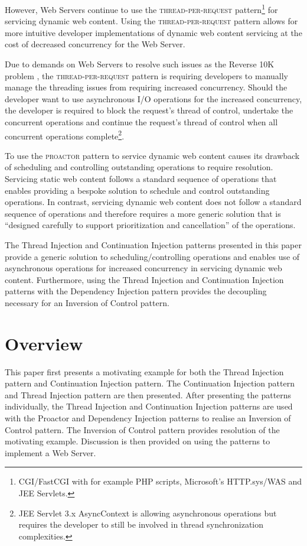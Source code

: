 \documentclass[prodmode]{style/acmlarge}
\begin{document}
However, Web Servers continue to use the \textsc{thread-per-request}
pattern\footnote{CGI/FastCGI with for example PHP scripts, Microsoft's
HTTP.sys/WAS and JEE Servlets.} for servicing dynamic web content.  Using the
\textsc{thread-per-request} pattern allows for more intuitive developer
implementations of dynamic web content servicing at the cost of decreased
concurrency for the Web Server.

Due to demands on Web Servers to resolve such issues as the Reverse 10K problem
\cite{reverse-ten-k-problem}, the \textsc{thread-per-request} pattern is
requiring developers to manually manage the threading issues from requiring
increased concurrency.  Should the developer want to use asynchronous I/O
operations for the increased concurrency, the developer is required to block the
request's thread of control, undertake the concurrent operations and continue
the request's thread of control when all concurrent operations
complete\footnote{JEE Servlet 3.x AsyncContext is allowing asynchronous
operations but requires the developer to still be involved in thread
synchronization complexities.}.

To use the \textsc{proactor} pattern to service dynamic web content causes its
drawback of scheduling and controlling outstanding operations \cite[p.
8]{proactor} to require resolution.  Servicing static web content follows a
standard sequence of operations that enables providing a bespoke solution to
schedule and control outstanding operations.  In contrast, servicing dynamic web
content does not follow a standard sequence of operations and therefore requires
a more generic solution that is ``designed carefully to support prioritization
and cancellation'' \cite[p. 8]{proactor} of the operations.

The Thread Injection and Continuation Injection patterns presented in this paper
provide a generic solution to scheduling/controlling operations and enables use
of asynchronous operations for increased concurrency in servicing dynamic web
content.  Furthermore, using the Thread Injection and Continuation Injection
patterns with the Dependency Injection pattern \cite{ioc} provides the
decoupling necessary for an Inversion of Control pattern.


\section{Overview}

This paper first presents a motivating example for both the Thread Injection
pattern and Continuation Injection pattern.  The Continuation Injection pattern
and Thread Injection pattern are then presented.  After presenting the patterns
individually, the Thread Injection and Continuation Injection patterns are used
with the Proactor and Dependency Injection patterns to realise an Inversion of
Control pattern.  The Inversion of Control pattern provides resolution of the
motivating example.  Discussion is then provided on using the patterns to
implement a Web Server.
\end{document}
